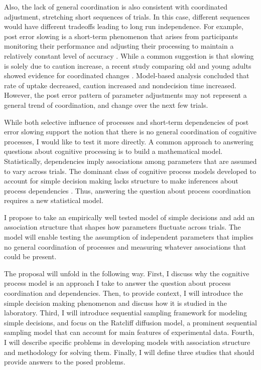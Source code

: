 \documentclass[12pt]{article}
\begin{document}
	Also, the lack of general coordination is also consistent with coordinated adjustment, stretching short sequences of trials. In this case, different sequences would have different tradeoffs leading to long run independence. For example, post error slowing is a short-term phenomenon that arises from participants monitoring their performance and adjusting their processing to maintain a relatively constant level of accuracy \citep{VanMal2004}. While a common suggestion is that slowing is solely due to caution increase, a recent study comparing old and young adults showed evidence for coordinated changes \citep{DutFor2013}. Model-based analysis concluded that rate of uptake decreased, caution increased and nondecision time increased. However, the post error pattern of parameter adjustments may not represent a general trend of coordination, and change over the next few trials.
    
	While both selective influence of processes and short-term dependencies of post error slowing support the notion that there is no general coordination of cognitive processes, I would like to test it more directly. A common approach to answering questions about cognitive processing is to build a mathematical model. Statistically, dependencies imply associations among parameters that are assumed to vary across trials. The dominant class of cognitive process models developed to account for simple decision making lacks structure to make inferences about process dependencies \citep{SmiRat2004}. Thus, answering the question about process coordination requires a new statistical model.
    
	I propose to take an empirically well tested model of simple decisions and add an association structure that shapes how parameters fluctuate across trials. The model will enable testing the assumption of independent parameters that implies no general coordination of processes and measuring whatever associations that could be present. 
    
	The proposal will unfold in the following way. First, I discuss why the cognitive process model is an approach I take to answer the question about process coordination and dependencies. Then, to provide context, I will introduce the simple decision making phenomenon and discuss how it is studied in the laboratory. Third, I will introduce sequential sampling framework for modeling simple decisions, and focus on the Ratcliff diffusion model, a prominent sequential sampling model that can account for main features of experimental data. Fourth, I will describe specific problems in developing models with association structure and methodology for solving them. Finally, I will define three studies that should provide answers to the posed problems.
\end{document}
